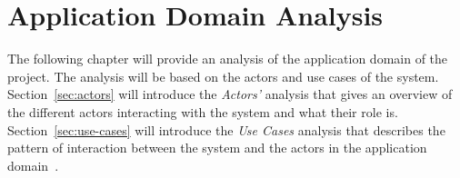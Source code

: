 \section{Application Domain Analysis}\label{sec:application-domain-analysis}
The following chapter will provide an analysis of the application domain of the project.
The analysis will be based on the actors and use cases of the system.
Section~\ref{sec:actors} will introduce the \textit{Actors'} analysis that gives an overview of the different actors
interacting with the system and what their role is.
Section~\ref{sec:use-cases} will introduce the \textit{Use Cases} analysis that describes the pattern of interaction
between the system and the actors in the application domain~\cite{mathiassen2018}.
\pagebreak



